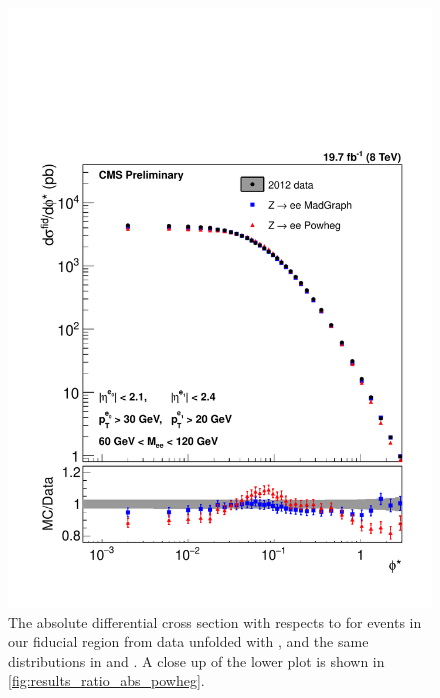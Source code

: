 \begin{figure}[!p]
    \centering
    \includegraphics[width=\textwidth]{figures/ZShape_elec_PH_Abs_Dressed.pdf}
    \caption[
        The absolute differential cross section with respects to \phistar for
        \Ztoee events in our fiducial region from data unfolded with
        \PPsixZtwo.
    ]{
        The absolute differential cross section with respects to \phistar for
        \Ztoee events in our fiducial region from data unfolded with
        \PPsixZtwo, and the same distributions in \MADGRAPH and \PPsixZtwo. A
        close up of the lower plot is shown in
        \cref{fig:results_ratio_abs_powheg}.
    }
    \label{fig:results_abs_powheg}
\end{figure}

